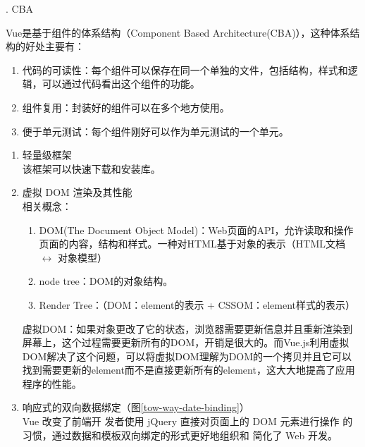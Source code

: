 . CBA

Vue是基于组件的体系结构（Component Based Architecture(CBA)），这种体系结构的好处主要有：
\begin{enumerate}
  \item 代码的可读性：每个组件可以保存在同一个单独的文件，包括结构，样式和逻辑，可以通过代码看出这个组件的功能。
  \item 组件复用：封装好的组件可以在多个地方使用。
  \item 便于单元测试：每个组件刚好可以作为单元测试的一个单元。
\end{enumerate}

\begin{enumerate}
  \item 轻量级框架\\该框架可以快速下载和安装库。
  \item 虚拟 DOM 渲染及其性能\\
        相关概念：
        \begin{enumerate}
          \item DOM(The Document Object Model)：Web页面的API，允许读取和操作页面的内容，结构和样式。一种对HTML基于对象的表示（HTML文档 $\leftrightarrow$ 对象模型）
          \item node tree：DOM的对象结构。
          \item Render Tree：（DOM：element的表示 + CSSOM：element样式的表示）
        \end{enumerate}
        虚拟DOM：如果对象更改了它的状态，浏览器需要更新信息并且重新渲染到屏幕上，这个过程需要更新所有的DOM，开销是很大的。而Vue.js利用虚拟DOM解决了这个问题，可以将虚拟DOM理解为DOM的一个拷贝并且它可以找到需要更新的element而不是直接更新所有的element，这大大地提高了应用程序的性能。
  \item 响应式的双向数据绑定（图\ref{tow-way-date-binding}）\\
        Vue 改变了前端开 发者使用 jQuery 直接对页面上的 DOM 元素进行操作 的习惯，通过数据和模板双向绑定的形式更好地组织和 简化了 Web 开发。\cite{.2020g}


\end{enumerate}
